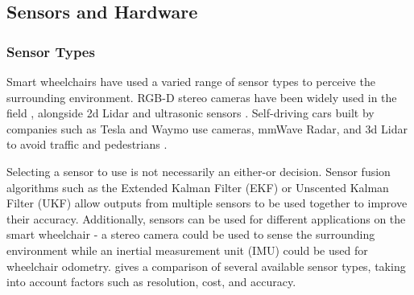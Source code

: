 

\subsection{Sensors and Hardware}

\subsubsection{Sensor Types}
Smart wheelchairs have used a varied range of sensor types to perceive the surrounding environment.
RGB-D stereo cameras have been widely used in the field \cite{wangS2P2SelfSupervisedGoalDirected2021}\cite{wangSelfSupervisedDrivableArea2019}\cite{jainAutomatedPerceptionSafe2014},
alongside 2d Lidar \cite{scudellariSelfdrivingWheelchairsDebut2017} and ultrasonic sensors \cite{levineNavChairAssistiveWheelchair1999}.
Self-driving cars built by companies such as Tesla and Waymo
use cameras, mmWave Radar, and 3d Lidar to avoid traffic and pedestrians \cite{karpathyTeslaAIDay2021}.

Selecting a sensor to use is not necessarily an either-or decision. Sensor fusion algorithms such as
the Extended Kalman Filter (EKF) or Unscented Kalman Filter (UKF) \cite{wanUnscentedKalmanFilter2000} allow
outputs from multiple sensors to be used together to improve their accuracy. Additionally, sensors can
be used for different applications on the smart wheelchair - a stereo camera could be used to sense the surrounding environment
while an inertial measurement unit (IMU) could be used for wheelchair odometry.
 gives a comparison of several available sensor types,
taking into account factors such as resolution, cost, and accuracy.

